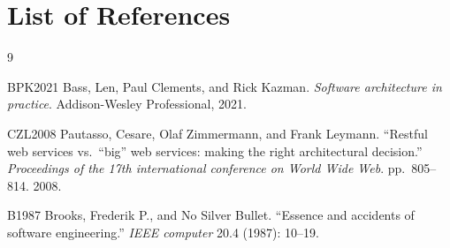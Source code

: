 \newpage
\section*{List of References}

%

\begin{thebibliography}{9}

BPK2021 Bass, Len, Paul Clements, and Rick Kazman. \textit{Software architecture in practice}. Addison-Wesley Professional, 2021.

CZL2008 Pautasso, Cesare, Olaf Zimmermann, and Frank Leymann. ``Restful web services vs.\ ``big'' web services: making the right architectural decision.'' \textit{Proceedings of the 17th international conference on World Wide Web}. pp.\ 805--814. 2008.

B1987 Brooks, Frederik P., and No Silver Bullet. ``Essence and accidents of software engineering.'' \textit{IEEE computer} 20.4 (1987): 10--19.

\end{thebibliography}

